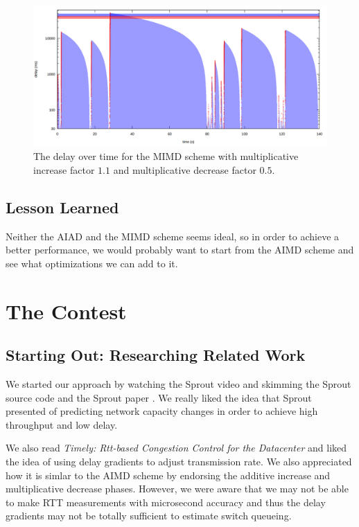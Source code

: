\documentclass[11pt,a4paper]{article}
\begin{document}
\begin{figure}[h]
  \centering
  \includegraphics[scale=0.2]{mimd-2}
  \caption{The delay over time for the MIMD scheme with multiplicative increase factor
    $1.1$ and multiplicative decrease factor $0.5$.}
  \label{fig:mimd2}
\end{figure}

\subsection{Lesson Learned}

Neither the AIAD and the MIMD scheme seems ideal, so in order to achieve a
better performance, we would probably want to start from the AIMD scheme and see
what optimizations we can add to it.

\section{The Contest}
\subsection{Starting Out: Researching Related Work}

We started our approach by watching the Sprout video and skimming the Sprout
source code and the Sprout paper \cite{winstein2013stochastic}. We really liked the idea that Sprout presented of predicting network
capacity changes in order to achieve high throughput and low delay. 

We also read \textit{Timely: Rtt-based Congestion Control for the Datacenter}
\cite{mittal2015timely} and liked
the idea of using delay gradients to adjust transmission rate. We also
appreciated how it is simlar to the AIMD scheme by endorsing the
additive increase and multiplicative decrease phases. However, we were
aware that we may not be able to make RTT measurements with microsecond accuracy
and thus the delay gradients may not be totally sufficient to estimate switch
queueing. 
\end{document}
